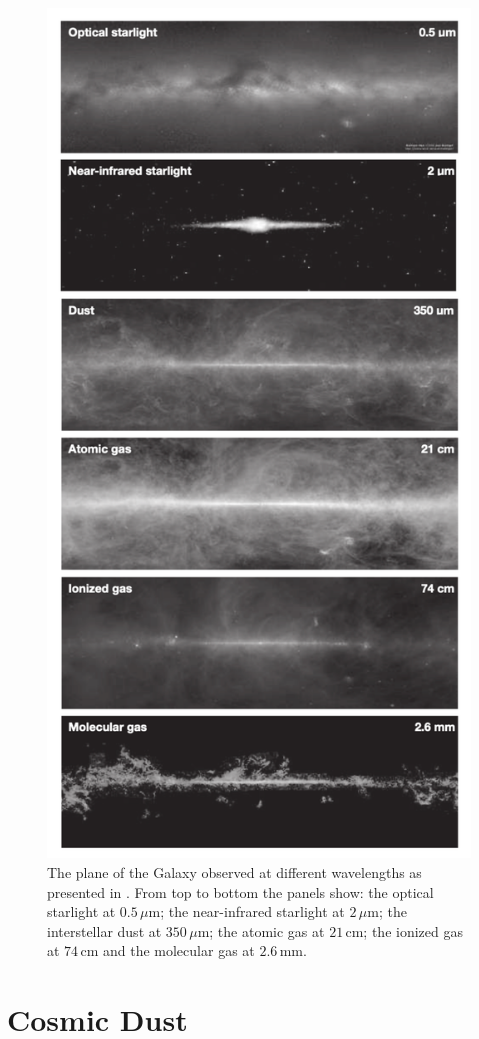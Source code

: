 \begin{figure}
    \centering
	\includegraphics[width=0.75\columnwidth, height=0.92\textheight]{Figures/interstellar_medium.pdf}
	\caption[The plane of the Galaxy observed at various wavelengths]{The plane of the Galaxy observed at different wavelengths as presented in \citealt{Williams_2021}. From top to bottom the panels show: the optical starlight at $0.5\,\mu$m; the near-infrared starlight at $2\,\mu$m; the interstellar dust at $350\,\mu$m; the atomic gas at $21\,$cm; the ionized gas at $74\,$cm and the molecular gas at $2.6\,$mm.}
	\label{fig:interstellar_medium}
\end{figure}

\section{Cosmic Dust}

